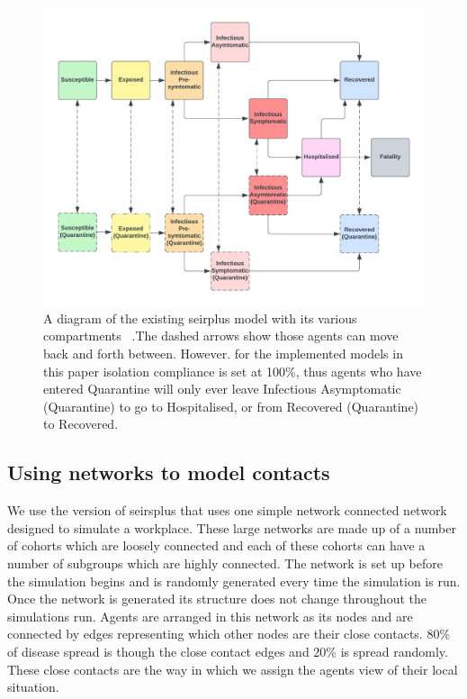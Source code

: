 \documentclass{article}
\begin{document}
\begin{figure}[h!]
\centering
\includegraphics[width=\textwidth]{SIR}
\caption{A diagram of the existing seirplus model with its various compartments ~\cite{mcgee_2021}.The dashed arrows show those agents can move back and forth between. However. for the implemented models in this paper isolation compliance is set at 100\%, thus agents who have entered Quarantine will only ever leave Infectious Asymptomatic (Quarantine) to go to Hospitalised, or from Recovered (Quarantine) to Recovered.}
\end{figure}

\newpage


\subsection{Using networks to model contacts}

We use the version of seirsplus that uses one simple network connected network designed to simulate a workplace. These large networks are made up of a number of cohorts which are loosely connected and each of these cohorts can have a number of subgroups which are highly connected. The network is set up before the simulation begins and is randomly generated every time the simulation is run. Once the network is generated its structure does not change throughout the simulations run.  Agents are arranged in this network as its nodes and are connected by edges representing which other nodes are their close contacts. 80\% of disease spread is though the close contact edges and 20\% is spread randomly. These close contacts are the way in which we assign the agents view of their local situation.
\end{document}
